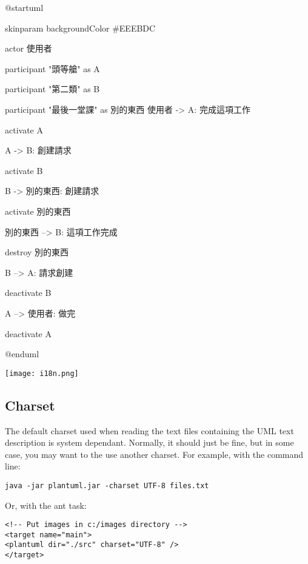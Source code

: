 {\cjkfont
$@$startuml
\par
skinparam backgroundColor \#EEEBDC
\par
actor 使用者
\par
participant "頭等艙" as A
\par
participant "第二類" as B
\par
participant "最後一堂課" as 別的東西
\vskip 7mm
使用者 -> A: 完成這項工作
\par
activate A
\par
A -> B: 創建請求
\par
activate B
\par
\par
B -> 別的東西: 創建請求
\par
activate 別的東西
\par
別的東西 --> B: 這項工作完成
\par
destroy 別的東西
\par
B --> A: 請求創建
\par
deactivate B
\par
A --> 使用者: 做完
\par
deactivate A
\par
$@$enduml
}

\vskip 7mm

\begin{center}
\texttt{[image: i18n.png]}
\end{center}

\subsection{Charset} 

The default charset used when reading the text files containing the UML text description is system 
dependant. 
Normally, it should just be fine, but in some case, you may want to the use another charset. For 
example, with the command line: 


\begin{lstlisting}
java -jar plantuml.jar -charset UTF-8 files.txt 
\end{lstlisting}

Or, with the ant task: 

\begin{lstlisting}
<!-- Put images in c:/images directory -->
<target name="main">
<plantuml dir="./src" charset="UTF-8" />
</target> 
\end{lstlisting}



